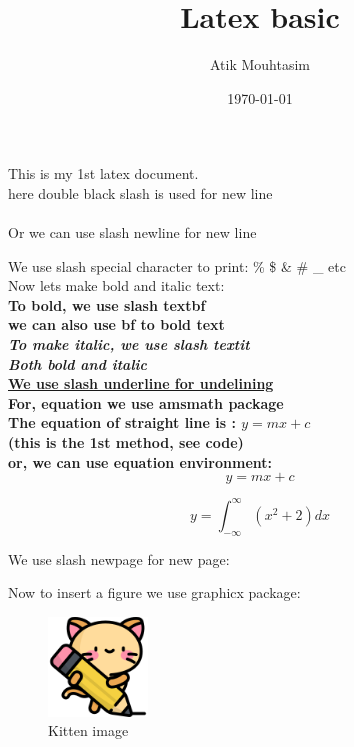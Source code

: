 \documentclass[a4paper,12pt]{article}
\title{Latex basic}
\author{Atik Mouhtasim}
\date{\today}
\begin{document}
\maketitle




This is my 1st latex document. \\
here double black slash is used for  new line  \\ \\
Or we can use slash newline for new line \newline

We use slash special character to print: \! \% \$ \& \# \_   etc \\

Now lets make bold and italic text: \\
\textbf{To bold, we use slash textbf}\\
\bf we can also use bf to bold text\\
\textit{To make italic, we use slash textit}\\ 
\textbf{\textit{Both bold and italic}}\\
\underline{We use slash underline for undelining}\\


For, equation we use amsmath package\\

The equation of straight line is : $y=mx+c$ \\
(this is the 1st method, see code) \\
or, we can use equation environment:
\begin{equation}
    y=mx+c
\end{equation} 


\begin{equation}
    y=\int_{-\infty}^{\infty} (x^2 +2) dx
    \label{eq2}
\end{equation}



We use slash newpage for new page:
\newpage %




Now to insert a figure we use graphicx package: \\
\begin{figure}[!hbt]
    \centering
    \includegraphics[width=100px]{kitty.png}
    \caption{Kitten image}
\end{figure}
\end{document}
